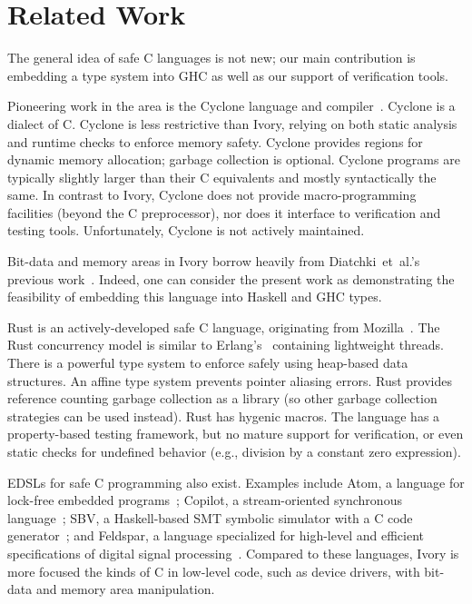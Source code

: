 \section{Related Work}
\label{sec:related-work}


The general idea of safe C languages is not new; our main contribution is
embedding a type system into GHC as well as our support of verification
tools.

Pioneering work in the area is the Cyclone language and
compiler~\cite{cyclone}. Cyclone is a dialect of C. Cyclone is less restrictive than
Ivory, relying on both static analysis and runtime checks to enforce memory
safety. Cyclone provides regions for dynamic memory allocation; garbage
collection is optional. Cyclone programs are typically slightly larger than
their C equivalents and mostly syntactically the same. In contrast to Ivory,
Cyclone does not provide macro-programming facilities (beyond the C
preprocessor), nor does it interface to verification and testing
tools. Unfortunately, Cyclone is not actively maintained.

Bit-data and memory areas in Ivory borrow heavily from Diatchki~et~al.'s
previous work~\cite{high-level, memareas}. Indeed, one can consider the present
work as demonstrating the feasibility of embedding this language into Haskell
and GHC types.

Rust is an actively-developed safe C language, originating from
Mozilla~\cite{rust}. The Rust concurrency model is similar to Erlang's~\cite{}
containing lightweight threads. There is a powerful type system to enforce
safely using heap-based data structures. An affine type system prevents pointer
aliasing errors. Rust provides reference counting garbage collection as a
library (so other garbage collection strategies can be used instead). Rust has
hygenic macros. The language has a property-based testing framework, but no
mature support for verification, or even static checks for undefined behavior
(e.g., division by a constant zero expression).

EDSLs for safe C programming also exist. Examples include Atom, a language for
lock-free embedded programs~\cite{atom}; Copilot, a stream-oriented synchronous
language~\cite{copilot}; SBV, a Haskell-based SMT symbolic simulator with a C code
generator~\cite{sbv}; and Feldspar, a language specialized for high-level and
efficient specifications of digital signal processing~\cite{feldspar1}. Compared to these
languages, Ivory is more focused the kinds of C in low-level code, such as
device drivers, with bit-data and memory area manipulation.
